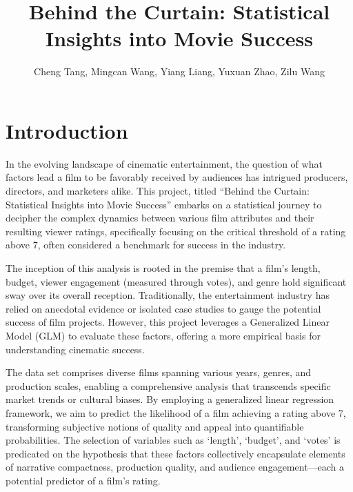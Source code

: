 \documentclass[
  11pt,
]{article}
\title{Behind the Curtain: Statistical Insights into Movie Success}
\author{Cheng Tang, Mingcan Wang, Yiang Liang, Yuxuan Zhao, Zilu Wang}
\date{}
\renewcommand*\contentsname{Table of contents}
\newcommand\contentsname{Table of contents}
\begin{document}
\maketitle
\ifdefined\Shaded\renewenvironment{Shaded}{\begin{tcolorbox}[enhanced, breakable, sharp corners, boxrule=0pt, borderline west={3pt}{0pt}{shadecolor}, interior hidden, frame hidden]}{\end{tcolorbox}}\fi

\renewcommand*\contentsname{Table of contents}
{
\hypersetup{linkcolor=}
\setcounter{tocdepth}{3}
\tableofcontents
}
\hypertarget{introduction}{%
\section{Introduction}\label{introduction}}

In the evolving landscape of cinematic entertainment, the question of
what factors lead a film to be favorably received by audiences has
intrigued producers, directors, and marketers alike. This project,
titled ``Behind the Curtain: Statistical Insights into Movie Success''
embarks on a statistical journey to decipher the complex dynamics
between various film attributes and their resulting viewer ratings,
specifically focusing on the critical threshold of a rating above 7,
often considered a benchmark for success in the industry.

The inception of this analysis is rooted in the premise that a film's
length, budget, viewer engagement (measured through votes), and genre
hold significant sway over its overall reception. Traditionally, the
entertainment industry has relied on anecdotal evidence or isolated case
studies to gauge the potential success of film projects. However, this
project leverages a Generalized Linear Model (GLM) to evaluate these
factors, offering a more empirical basis for understanding cinematic
success.

The data set comprises diverse films spanning various years, genres, and
production scales, enabling a comprehensive analysis that transcends
specific market trends or cultural biases. By employing a generalized
linear regression framework, we aim to predict the likelihood of a film
achieving a rating above 7, transforming subjective notions of quality
and appeal into quantifiable probabilities. The selection of variables
such as `length', `budget', and `votes' is predicated on the hypothesis
that these factors collectively encapsulate elements of narrative
compactness, production quality, and audience engagement---each a
potential predictor of a film's rating.
\end{document}
